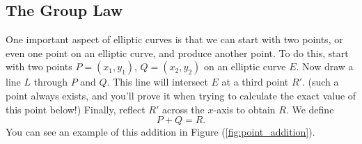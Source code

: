 \documentclass{article}
\begin{document}
\subsection*{The Group Law}
    One important aspect of elliptic curves is that we can start with two points, or even one point on an elliptic curve, and produce another point. To do this, start with two points $P = (x_{1}, y_{1})$, $Q = (x_{2}, y_{2})$ on an elliptic curve $E$. Now draw a line $L$ through $P$ and $Q$. This line will intersect $E$ at a third point $R'$. (such a point always exists, and you'll prove it when trying to calculate the exact value of this point below!) Finally, reflect $R'$ across the $x$-axis to obtain $R$. We define $$P + Q = R.$$ You can see an example of this addition in Figure (\ref{fig:point_addition}).

\begin{figure}[htbp]
    \centering
    

\end{figure}
\end{document}
